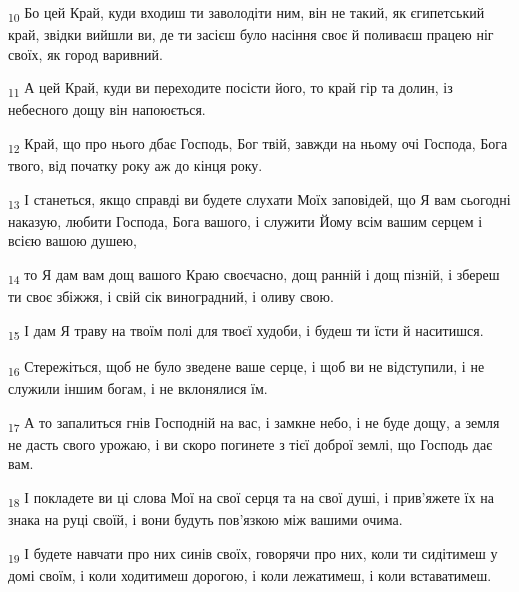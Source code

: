 \begin{tcolorbox}
\textsubscript{10} Бо цей Край, куди входиш ти заволодіти ним, він не такий, як єгипетський край, звідки вийшли ви, де ти засієш було насіння своє й поливаєш працею ніг своїх, як город варивний.
\end{tcolorbox}
\begin{tcolorbox}
\textsubscript{11} А цей Край, куди ви переходите посісти його, то край гір та долин, із небесного дощу він напоюється.
\end{tcolorbox}
\begin{tcolorbox}
\textsubscript{12} Край, що про нього дбає Господь, Бог твій, завжди на ньому очі Господа, Бога твого, від початку року аж до кінця року.
\end{tcolorbox}
\begin{tcolorbox}
\textsubscript{13} І станеться, якщо справді ви будете слухати Моїх заповідей, що Я вам сьогодні наказую, любити Господа, Бога вашого, і служити Йому всім вашим серцем і всією вашою душею,
\end{tcolorbox}
\begin{tcolorbox}
\textsubscript{14} то Я дам вам дощ вашого Краю своєчасно, дощ ранній і дощ пізній, і збереш ти своє збіжжя, і свій сік виноградний, і оливу свою.
\end{tcolorbox}
\begin{tcolorbox}
\textsubscript{15} І дам Я траву на твоїм полі для твоєї худоби, і будеш ти їсти й наситишся.
\end{tcolorbox}
\begin{tcolorbox}
\textsubscript{16} Стережіться, щоб не було зведене ваше серце, і щоб ви не відступили, і не служили іншим богам, і не вклонялися їм.
\end{tcolorbox}
\begin{tcolorbox}
\textsubscript{17} А то запалиться гнів Господній на вас, і замкне небо, і не буде дощу, а земля не дасть свого урожаю, і ви скоро погинете з тієї доброї землі, що Господь дає вам.
\end{tcolorbox}
\begin{tcolorbox}
\textsubscript{18} І покладете ви ці слова Мої на свої серця та на свої душі, і прив'яжете їх на знака на руці своїй, і вони будуть пов'язкою між вашими очима.
\end{tcolorbox}
\begin{tcolorbox}
\textsubscript{19} І будете навчати про них синів своїх, говорячи про них, коли ти сидітимеш у домі своїм, і коли ходитимеш дорогою, і коли лежатимеш, і коли вставатимеш.
\end{tcolorbox}
